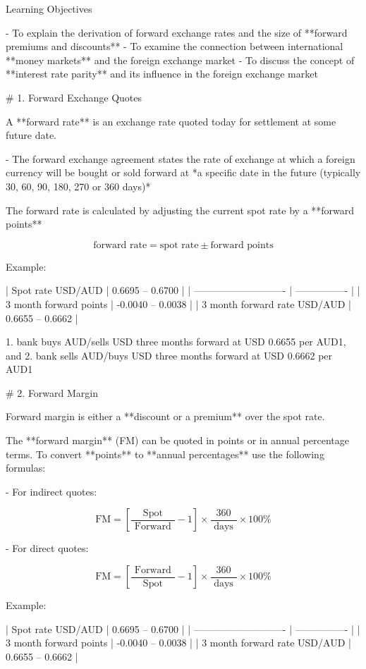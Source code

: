 \documentclass{article}
\begin{document}
Learning Objectives

- To explain the derivation of forward exchange rates and the size of **forward premiums and discounts**
- To examine the connection between international **money markets** and the foreign exchange market
- To discuss the concept of **interest rate parity** and its influence in the foreign exchange market

# 1. Forward Exchange Quotes

A **forward rate** is an exchange rate quoted today for settlement at some future date.

- The forward exchange agreement states the rate of exchange at which a foreign currency will be bought or sold forward at *a specific date in the future (typically 30, 60, 90, 180, 270 or 360 days)*

The forward rate is calculated by adjusting the current spot rate by a **forward points**

$$
\text{forward rate} = \text{spot rate} \pm \text{forward points}
$$

Example:

| Spot rate USD/AUD            | 0.6695 – 0.6700  |
| ---------------------------- | ---------------- |
| 3 month forward points       | -0.0040 – 0.0038 |
| 3 month forward rate USD/AUD | 0.6655 – 0.6662  |

1. bank buys AUD/sells USD three months forward at USD 0.6655 per AUD1, and
2. bank sells AUD/buys USD three months forward at USD 0.6662 per AUD1


# 2. Forward Margin

Forward margin is either a **discount or a premium** over the spot rate.

The **forward margin** (FM) can be quoted in points or in annual percentage terms. To convert **points** to **annual percentages** use the following formulas:

- For indirect quotes:

$$ 
\text{FM}=\left[\frac{\text { Spot }}{\text { Forward }}-1 \right] \times \frac{360}{\text { days }} \times 100\%
$$

- For direct quotes:

$$ 
\text{FM}=\left[\frac{\text { Forward }}{\text { Spot }}-1 \right] \times \frac{360}{\text { days }} \times 100\%
$$

Example:

| Spot rate USD/AUD            | 0.6695 – 0.6700  |
| ---------------------------- | ---------------- |
| 3 month forward points       | -0.0040 – 0.0038 |
| 3 month forward rate USD/AUD | 0.6655 – 0.6662  |
\end{document}
